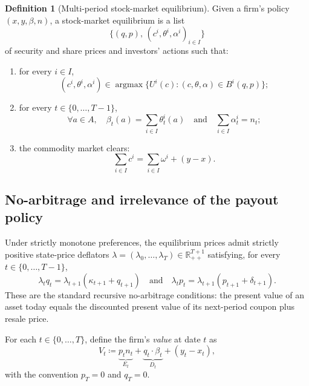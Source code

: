 \documentclass[11pt,a4paper,oneside]{book}
\def\R{\mathbb{R}}
\def\et{\quad \text{and} \quad}
\DeclareMathOperator*{\argmax}{argmax}
\theoremstyle{plain}
\theoremstyle{definition}
\newtheorem{definition}[theorem]{Definition}
\theoremstyle{remark}
\numberwithin{equation}{chapter}
\begin{document}
\begin{definition}[Multi-period stock-market equilibrium]\label{def:eq-multiperiod}
Given a firm's policy $(x, y, \beta, n)$, a stock-market equilibrium is a list
\begin{equation*}
  \bigl\{ (q, p), \, (c^i, \theta^i, \alpha^i)_{i \in I} \bigr\}
\end{equation*}
of security and share prices and investors' actions such that:
\begin{enumerate}
  \item[(a)] for every $i \in I$,
  \begin{equation*}
    (c^i, \theta^i, \alpha^i) \in \argmax \bigl\{ U^i(c) \colon (c, \theta, \alpha) \in B^i(q, p) \bigr\};
  \end{equation*}
  \item[(b)] for every $t \in \{0, \ldots, T-1\}$,
  \begin{equation*}
    \forall a \in A, \quad \beta_t(a) = \sum_{i \in I} \theta^i_t(a)
    \et
    \sum_{i \in I} \alpha^i_t = n_t;
  \end{equation*}
  \item[(c)] the commodity market clears:
  \begin{equation*}
    \sum_{i \in I} c^i = \sum_{i \in I} \omega^i + (y - x).
  \end{equation*}
\end{enumerate}
\end{definition}

\subsection{No-arbitrage and irrelevance of the payout policy}

Under strictly monotone preferences, the equilibrium prices admit strictly positive state-price deflators $\lambda = (\lambda_0, \ldots, \lambda_T) \in \R_{++}^{T+1}$ satisfying, for every $t \in \{0, \ldots, T-1\}$,
\begin{equation}\label{eq:no-arb-MP}
  \lambda_t q_t = \lambda_{t+1} (\kappa_{t+1} + q_{t+1})
  \et
  \lambda_t p_t = \lambda_{t+1} (p_{t+1} + \delta_{t+1}).
\end{equation}
These are the standard recursive no-arbitrage conditions: the present value of an asset today equals the discounted present value of its next-period coupon plus resale price.

For each $t \in \{0, \ldots, T\}$, define the firm's \emph{value} at date $t$ as
\begin{equation}\label{eq:firm-value-MP}
  V_t \coloneqq \underbrace{p_t n_t}_{E_t} + \underbrace{q_t \cdot \beta_t}_{D_t} + (y_t - x_t),
\end{equation}
with the convention $p_T = 0$ and $q_T = 0$.
\end{document}
